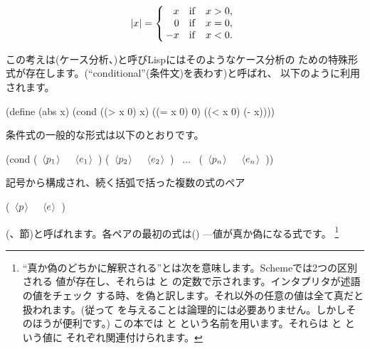 \begin{comment}

\begin{example}
      /
      |   x  if x > 0
|x| = <   0  if x = 0
      |  -x  if x < 0
      \
\end{example}

\end{comment}
\begin{displaymath}
 |x| = \left\{ \begin{array}{r@{\quad \mathrm{if} \quad}l}	 	 
        x  &  x > 0, \\
	0  &  x = 0, \\
  \!\! -x  &  x < 0. \end{array} \right. 
\end{displaymath}

この考えは(ケース分析、)と呼びLispにはそのようなケース分析の
ための特殊形式が存在します。\code{cond}(``conditional''(条件文)を表わす)と呼ばれ、
以下のように利用されます。

\begin{scheme}
(define (abs x)
  (cond ((> x 0) x)
        ((= x 0) 0)
        ((< x 0) (- x))))
\end{scheme}

\noindent
条件式の一般的な形式は以下のとおりです。

\begin{scheme}
(cond (~\( \dark \langle{p_1}\kern0.08em\rangle \)~ ~\( \dark \langle{e_1}\kern0.08em\rangle \)~)
      (~\( \dark \langle{p_2}\kern0.08em\rangle \)~ ~\( \dark \langle{e_2}\kern0.08em\rangle \)~)
      ~\( \dots \)~
      (~\( \dark \langle{p_n}\kern0.08em\rangle \)~ ~\( \dark \langle{e_n}\kern0.08em\rangle \)~))
\end{scheme}

\noindent
記号から構成され、続く括弧で括った複数の式のペア

\begin{scheme}
(~\( \dark \langle{p}\kern0.08em\rangle \)~ ~\( \dark \langle{e}\kern0.08em\rangle \)~)
\end{scheme}

\noindent
{}(、節)と呼ばれます。各ペアの最初の式は()
---値が真か偽になる式です。
\footnote{``真か偽のどちかに解釈される''とは次を意味します。Schemeでは2つの区別される
値が存在し、それらは  と の定数で示されます。インタプリタが述語の値をチェック
する時、\code{\#f}を偽と訳します。それ以外の任意の値は全て真だと扱われます。(従って
を与えることは論理的には必要ありません。しかしそのほうが便利です。)
この本では と という名前を用います。それらは と という値に
それぞれ関連付けられます。}


